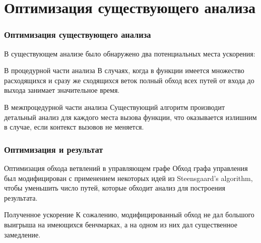 \documentclass[utf8,russian]{beamer}
\begin{document}
\section{Оптимизация существующего анализа}

\begin{frame}
\frametitle{Оптимизация существующего анализа}

\begin{block}{}
В существующем анализе было обнаружено два потенциальных места ускорения:
\end{block}

\begin{block}{В процедурной части анализа}
В случаях, когда в функции имеется множество расходящихся и сразу же сходящихся веток полный обход всех путей от входа до выхода занимает значительное время.
\end{block}

\begin{block}{В межпроцедурной части анализа}
Существующий алгоритм производит детальный анализ для каждого места вызова функции, что оказывается излишним в случае, если контекст вызовов не меняется.
\end{block}

\end{frame}


\begin{frame}
\frametitle{Оптимизация и результат}

\begin{block}{Оптимизация обхода ветвлений в управляющем графе}
Обход графа управления был модифицирован с применением некоторых идей из Steensgaard’s algorithm, чтобы уменьшить число путей, которые обходит анализ для построения результата.
\end{block}

\begin{block}{Полученное ускорение}
К сожалению, модифицированный обход не дал большого выигрыша на имеющихся бенчмарках, а на одном из них дал существенное замедление.
\end{block}

\end{frame}
\end{document}
